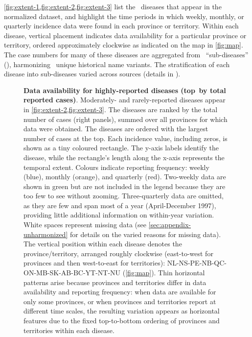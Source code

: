 \documentclass[12pt]{article}
\begin{document}
\newpage 

\cref{fig:extent-1,fig:extent-2,fig:extent-3} list the \ diseases that appear in the normalized dataset, and highlight the time periods in which weekly, monthly, or quarterly incidence data were found in each province or territory. Within each disease, vertical placement indicates data availability for a particular province or territory, ordered approximately clockwise as indicated on the map in \cref{fig:map}. The case numbers for many of these diseases are aggregated from \ ``sub-diseases'' (), harmonizing \ unique historical name variants. The stratification of each disease into sub-diseases varied across sources (details in ).

\newpage



\newpage

\begin{figure}[!ht]
  \caption{\textbf{Data availability for highly-reported diseases (top \protect\,by total reported cases)}. Moderately- and rarely-reported diseases appear in \cref{fig:extent-2,fig:extent-3}. The diseases are ranked by the total number of cases (right panels), summed over all provinces for which data were obtained. The diseases are ordered with the largest number of cases at the top. Each incidence value, including zeros, is shown as a tiny coloured rectangle. The y-axis labels identify the disease, while the rectangle's length along the x-axis represents the temporal extent. Colours indicate reporting frequency: weekly (blue), monthly (orange), and quarterly (red). Two-weekly data are shown in green but are not included in the legend because they are too few to see without zooming. Three-quarterly data are omitted, as they are few and span most of a year (April-December 1997), providing little additional information on within-year variation. White spaces represent missing data (see \cref{sec:appendix-unharmonized} for details on the varied reasons for missing data). The vertical position within each disease denotes the province/territory, arranged roughly clockwise (east-to-west for provinces and then west-to-east for territories): NL-NS-PE-NB-QC-ON-MB-SK-AB-BC-YT-NT-NU (\cref{fig:map}). Thin horizontal patterns arise because provinces and territories differ in data availability and reporting frequency: when data are available for only some provinces, or when provinces and territories report at different time scales, the resulting variation appears as horizontal features due to the fixed top-to-bottom ordering of provinces and territories within each disease.}
  \label{fig:extent-1}
\end{figure}
\end{document}
